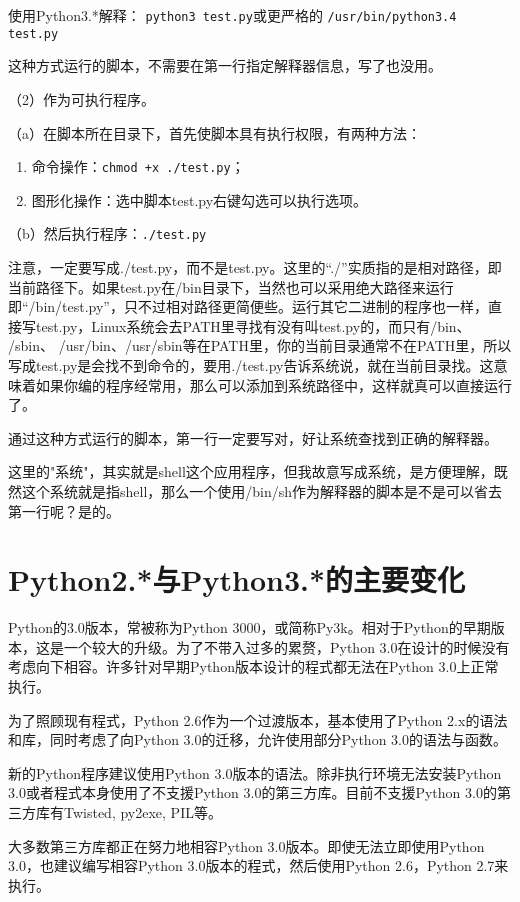 使用Python3.*解释：
\verb|python3 test.py|\qquad 或更严格的 \qquad \verb|/usr/bin/python3.4 test.py|

这种方式运行的脚本，不需要在第一行指定解释器信息，写了也没用。

（2）作为可执行程序。

（a）在脚本所在目录下，首先使脚本具有执行权限，有两种方法：
\begin{enumerate}
\item 命令操作：\verb|chmod +x ./test.py|；
\item 图形化操作：选中脚本test.py右键勾选可以执行选项。
\end{enumerate}

（b）然后执行程序：\verb|./test.py|

注意，一定要写成./test.py，而不是test.py。这里的“./”实质指的是相对路径，即当前路径下。如果test.py在/bin目录下，当然也可以采用绝大路径来运行即“/bin/test.py”，只不过相对路径更简便些。运行其它二进制的程序也一样，直接写test.py，Linux系统会去PATH里寻找有没有叫test.py的，而只有/bin、 /sbin、 /usr/bin、/usr/sbin等在PATH里，你的当前目录通常不在PATH里，所以写成test.py是会找不到命令的，要用./test.py告诉系统说，就在当前目录找。这意味着如果你编的程序经常用，那么可以添加到系统路径中，这样就真可以直接运行了。

通过这种方式运行的脚本，第一行一定要写对，好让系统查找到正确的解释器。

这里的"系统"，其实就是shell这个应用程序，但我故意写成系统，是方便理解，既然这个系统就是指shell，那么一个使用/bin/sh作为解释器的脚本是不是可以省去第一行呢？是的。



\section{Python2.*与Python3.*的主要变化}
Python的3​​.0版本，常被称为Python 3000，或简称Py3k。相对于Python的早期版本，这是一个较大的升级。为了不带入过多的累赘，Python 3.0在设计的时候没有考虑向下相容。许多针对早期Python版本设计的程式都无法在Python 3.0上正常执行。

为了照顾现有程式，Python 2.6作为一个过渡版本，基本使用了Python 2.x的语法和库，同时考虑了向Python 3.0的迁移，允许使用部分Python 3.0的语法与函数。

新的Python程序建议使用Python 3.0版本的语法。除非执行环境无法安装Python 3.0或者程式本身使用了不支援Python 3.0的第三方库。目前不支援Python 3.0的第三方库有Twisted, py2exe, PIL等。

大多数第三方库都正在努力地相容Python 3.0版本。即使无法立即使用Python 3.0，也建议编写相容Python 3.0版本的程式，然后使用Python 2.6，Python 2.7来执行。


